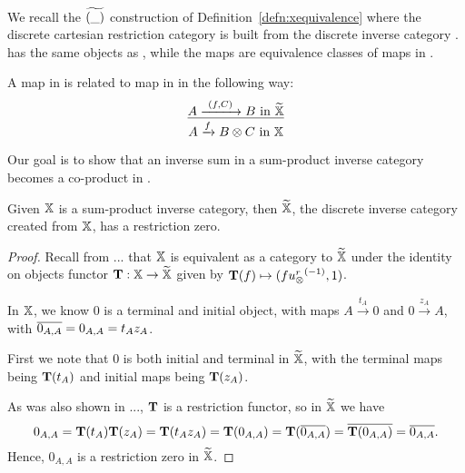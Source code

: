 We recall the $\widetilde{(\_)}$ construction of Definition~\ref{defn:xequivalence} where the discrete
cartesian restriction category \Xt is built from the discrete inverse category \X. \Xt has the same
objects as \X, while the maps are equivalence classes of maps in \X.

A map in \Xt is related to map in \X in the following way:
\[
  \infer{A\xrightarrow{f} B\*C \text{ in }\X}{A \xrightarrow{\ (f,C)\ } B \text{ in } \Xt}
\]

Our goal is to show that an inverse sum in a sum-product inverse category becomes a co-product
in \Xt.

\begin{lemma}\label{lem:x_tilde_has_a_restriction_zero}
  Given $\mathbb{X}$ is a sum-product inverse category, then $\widetilde{\mathbb{X}}$, the discrete inverse category created
  from $\mathbb{X}$, has a restriction zero.
\end{lemma}
\begin{proof}
  Recall from ... that $\mathbb{X}$ is equivalent as a category to $\widetilde{\mathbb{X}}$ under the identity on objects
  functor $\mathbf{T}:\mathbb{X} \to \widetilde{\mathbb{X}}$ given by $\mathbf{T}(f)\mapsto (f{u_{\otimes}^r}^{(-1)},1)$.

  In $\mathbb{X}$, we know $0$ is a terminal and initial object, with maps
  $A \xrightarrow{t_A} 0 $ and $0 \xrightarrow{z_A} A$, with $\overline{0_{A,A}} = 0_{A,A} = t_A z_A$.

  First we note that $0$ is both initial and terminal in $\widetilde{\mathbb{X}}$, with the terminal maps being
  $\mathbf{T}(t_A)$ and initial maps being $\mathbf{T}(z_A)$.

  As was also shown in ..., $\mathbf{T}$ is a restriction functor, so in $\widetilde{\mathbb{X}}$ we have
  \[
    0_{A,A} = \mathbf{T}(t_A)\mathbf{T}(z_A) = \mathbf{T}(t_A z_A) = \mathbf{T}(0_{A,A}) = \mathbf{T}(\overline{0_{A,A}}) =
    \overline{\mathbf{T}(0_{A,A})} = \overline{0_{A,A}}.
  \]
  Hence, $0_{A,A}$ is a restriction zero in $\widetilde{\mathbb{X}}$.
\end{proof}

